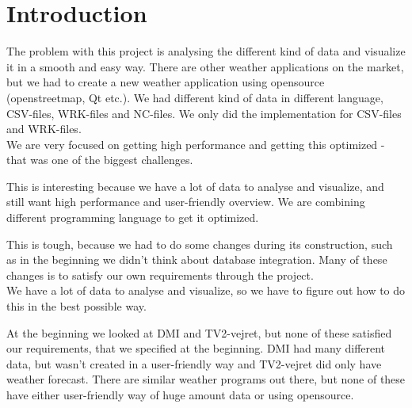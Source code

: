 \chapter{Introduction}



The problem with this project is analysing the different kind of data and visualize it in a smooth and easy way. There are other weather applications on the market, but we had to create a new weather application using opensource (openstreetmap, Qt etc.). We had different kind of data in different language, CSV-files, WRK-files and NC-files. We only did the implementation for CSV-files and WRK-files.\\
We are very focused on getting high performance and getting this optimized - that was one of the biggest challenges.

This is interesting because we have a lot of data to analyse and visualize, and still want high performance and user-friendly overview. We are combining different programming language to get it optimized.

This is tough, because we had to do some changes during its construction, such as in the beginning we didn't think about database integration. Many of these changes is to satisfy our own requirements through the project.\\
We have a lot of data to analyse and visualize, so we have to figure out how to do this in the best possible way.

At the beginning we looked at DMI and TV2-vejret, but none of these satisfied our requirements, that we specified at the beginning. DMI had many different data, but wasn't created in a user-friendly way and TV2-vejret did only have weather forecast. There are similar weather programs out there, but none of these have either user-friendly way of huge amount data or using opensource.


